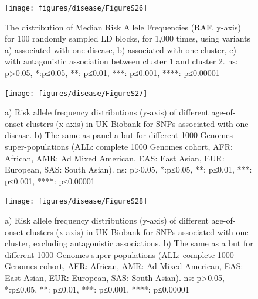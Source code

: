 \documentclass[12pt,twoside]{unicam}
\begin{document}
\begin{figure}

{\centering \texttt{[image: figures/disease/FigureS26]} 

}

\caption[The distribution of Median Risk Allele Frequencies for LD blocks.]{The distribution of Median Risk Allele Frequencies (RAF, y-axis) for 100 randomly sampled LD blocks, for 1,000 times, using variants a) associated with one disease, b) associated with one cluster, c) with antagonistic association between cluster 1 and cluster 2. ns: p>0.05, *:p≤0.05, **: p≤0.01, ***: p≤0.001, ****: p≤0.00001}\label{fig:disFigS26}
\end{figure}

\begin{figure}

{\centering \texttt{[image: figures/disease/FigureS27]} 

}

\caption[Risk allele frequency distributions of different age-of-onset clusters for SNPs associated with one disease.]{a) Risk allele frequency distributions (y-axis) of different age-of-onset clusters (x-axis) in UK Biobank for SNPs associated with one disease. b) The same as panel a but for different 1000 Genomes super-populations (ALL: complete 1000 Genomes cohort, AFR: African, AMR: Ad Mixed American, EAS: East Asian, EUR: European, SAS: South Asian). ns: p>0.05, *:p≤0.05, **: p≤0.01, ***: p≤0.001, ****: p≤0.00001}\label{fig:disFigS27}
\end{figure}

\begin{figure}

{\centering \texttt{[image: figures/disease/FigureS28]} 

}

\caption[Risk allele frequency distributions of different age-of-onset clusters for SNPs associated with one cluster.]{a) Risk allele frequency distributions (y-axis) of different age-of-onset clusters (x-axis) in UK Biobank for SNPs associated with one cluster, excluding antagonistic associations. b) The same as a but for different 1000 Genomes super-populations (ALL: complete 1000 Genomes cohort, AFR: African, AMR: Ad Mixed American, EAS: East Asian, EUR: European, SAS: South Asian). ns: p>0.05, *:p≤0.05, **: p≤0.01, ***: p≤0.001, ****: p≤0.00001}\label{fig:disFigS28}
\end{figure}
\end{document}
